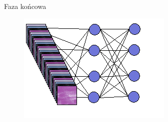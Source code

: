 \documentclass[xcolor=dvipsnames]{beamer}
\begin{document}
\begin{frame}{Faza końcowa}
	\begin{figure}
		\includegraphics[width=\linewidth, height=0.7\textheight, keepaspectratio] {img/fully_connected_layer.png}
	\end{figure}
\end{frame}
\end{document}
